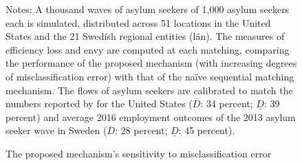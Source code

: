 \documentclass[12pt,fleqn]{article}
\begin{document}
\begin{figure}
	\caption{The proposed mechanism's sensitivity to misclassification error \label{FIG-miclassification}}
	\vspace{-0.7em}
	\vspace{-0.7em}
	\vspace{-0.7em}

	{\scriptsize \vspace{-1em}
	\begin{singlespace}
		{\sc Notes:} A thousand waves of asylum seekers of 1,000 asylum seekers each is simulated, distributed across 51 locations in the United States and the 21 Swedish regional entities (l{\"a}n). The measures of efficiency loss and envy are computed at each matching, comparing the performance of the proposed mechanism (with increasing degrees of misclassification error) with that of the na\"{i}ve sequential matching mechanism. The flows of asylum seekers are calibrated to match the numbers reported by \cite{bib:BansakEtAl} for the United States ($\overline{D}$: 34 percent; $\underline{D}$: 39 percent) and average 2016 employment outcomes of the 2013 asylum seeker wave in Sweden ($\overline{D}$: 28 percent; $\underline{D}$: 45 percent).
	\end{singlespace}
	 }
\end{figure}
\end{document}
